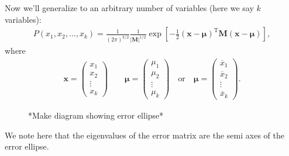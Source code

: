 \documentclass{article}
\newcommand{\vecb}[1]{\boldsymbol{\mathbf{#1}}}
\begin{document}
Now we'll generalize to an arbitrary number of variables (here we say $k$ variables):
\begin{align}
  P(x_1,x_2,\dotsc,x_k) = \frac{1}{(2\pi)^{k/2}}\frac{1}{|\vecb{M}|^{1/2}}\exp\left[-\frac{1}{2}\left(\vecb{x}-\boldsymbol{\mu}\right)^{\mathrm{T}}\vecb{M}\left(\vecb{x}-\boldsymbol{\mu}\right)\right],
\end{align}
where
\begin{align}
  \vecb{x} = \begin{pmatrix}
    x_1    \\
    x_2    \\
    \vdots \\
    x_k
  \end{pmatrix}
  \qquad
 \boldsymbol{\mu} = \begin{pmatrix}
   \mu_1   \\
   \mu_2   \\
   \vdots  \\
   \mu_k
 \end{pmatrix}
 \quad \text{or} \quad
   \boldsymbol{\mu} = \begin{pmatrix}
     \overline{x}_1 \\
     \overline{x}_2 \\
     \vdots \\
     \overline{x}_k
   \end{pmatrix}.
\end{align}
\begin{figure}[h!]
  \centering
  *Make diagram showing error ellipse*
\end{figure}
We note here that the eigenvalues of the error matrix are the semi axes of the error ellipse.
\end{document}
